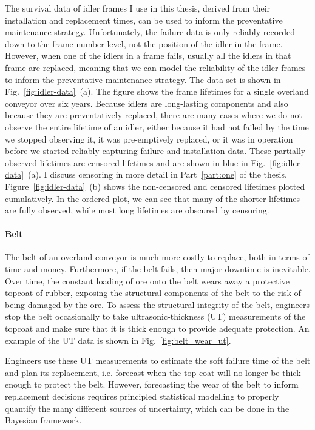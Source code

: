 The survival data of idler frames I use in this thesis, derived from their installation and replacement times, can be used to inform the preventative maintenance strategy. Unfortunately, the failure data is only reliably recorded down to the frame number level, not the position of the idler in the frame. However, when one of the idlers in a frame fails, usually all the idlers in that frame are replaced, meaning that we can model the reliability of the idler frames to inform the preventative maintenance strategy. The data set is shown in Fig.~\ref{fig:idler-data}~(a). The figure shows the frame lifetimes for a single overland conveyor over six years. Because idlers are long-lasting components and also because they are preventatively replaced, there are many cases where we do not observe the entire lifetime of an idler, either because it had not failed by the time we stopped observing it, it was pre-emptively replaced, or it was in operation before we started reliably capturing failure and installation data. These partially observed lifetimes are censored lifetimes and are shown in blue in Fig.~\ref{fig:idler-data}~(a). I discuss censoring in more detail in Part~\ref{part:one} of the thesis. Figure~\ref{fig:idler-data}~(b) shows the non-censored and censored lifetimes plotted cumulatively. In the ordered plot, we can see that many of the shorter lifetimes are fully observed, while most long lifetimes are obscured by censoring.

\paragraph*{Belt}

The belt of an overland conveyor is much more costly to replace, both in terms of time and money. Furthermore, if the belt fails, then major downtime is inevitable. Over time, the constant loading of ore onto the belt wears away a protective topcoat of rubber, exposing the structural components of the belt to the risk of being damaged by the ore. To assess the structural integrity of the belt, engineers stop the belt occasionally to take ultrasonic-thickness (UT) measurements of the topcoat and make sure that it is thick enough to provide adequate protection. An example of the UT data is shown in Fig.~\ref{fig:belt_wear_ut}.

Engineers use these UT measurements to estimate the soft failure time of the belt and plan its replacement, i.e. forecast when the top coat will no longer be thick enough to protect the belt. However, forecasting the wear of the belt to inform replacement decisions requires principled statistical modelling to properly quantify the many different sources of uncertainty, which can be done in the Bayesian framework.

